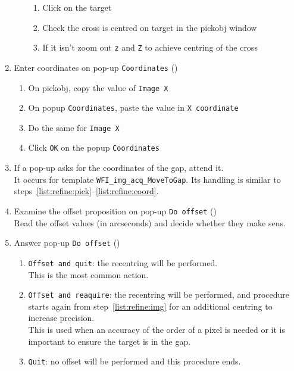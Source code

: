\documentclass[11pt,fleqn,a4paper]{book}
\begin{document}
\begin{enumerate}
\begin{enumerate}
\begin{enumerate}
            \item Click on the target
            \item Check the cross is centred on target in the \gls{pickobj} window 
            \item If it isn't zoom out \texttt{z} and \texttt{Z} to achieve centring of the cross
        \end{enumerate}
    \end{enumerate}
    \item\label{list:refine:coord} Enter coordinates on pop-up \texttt{Coordinates} ()
    \begin{enumerate}
        \item On \gls{pickobj}, copy the value of \texttt{Image X}
        \item On popup \texttt{Coordinates}, paste the value in \texttt{X coordinate}
        \item Do the same for \texttt{Image X}
        \item Click \texttt{OK} on the popup \texttt{Coordinates}
    \end{enumerate}
    \item If a pop-up asks for the coordinates of the gap, attend it.\\
          It occurs for template \texttt{WFI\_img\_acq\_MoveToGap}.
          Its handling is similar to steps~\ref{list:refine:pick}--\ref{list:refine:coord}. 
    \item Examine the offset proposition on pop-up \texttt{Do offset} ()\\
          Read the offset values (in arcseconds) and decide whether they make sens.
    \item Answer pop-up \texttt{Do offset} ()
    \begin{enumerate}
        \item \texttt{Offset and quit}: the recentring will be performed.\\
        This is the most common action.
        \item \texttt{Offset and reaquire}: the recentring will be performed, and procedure starts again from step~\ref{list:refine:img} for an additional centring to increase precision.\\
        This is used when an accuracy of the order of a pixel is needed or it is important to ensure the target is in the gap.
        \item \texttt{Quit}: no offset will be performed and this procedure ends.\\

\end{enumerate}
\end{enumerate}
\end{document}
